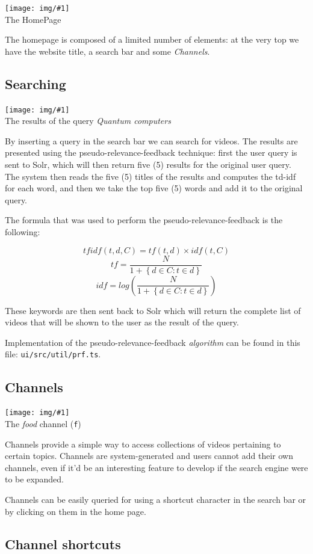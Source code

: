 \documentclass[12pt]{exam}
\newcommand{\lp}{\left(}
\newcommand{\rp}{\right)}
\newcommand{\pic}[2]{{
\begin{center}
\texttt{[image: img/\#1]} \\
{#2}
\end{center}
}}
\begin{document}
\pic{se_home}{The HomePage}

The homepage is composed of a limited number of elements: at the very
top we have the website title, a search bar and some \textit{Channels}.

\subsection{Searching}

\pic{se_query}{The results of the query \textit{Quantum computers}}

By inserting a query in the search bar we can search for videos.
The results are presented using the pseudo-relevance-feedback technique:
first the user query is sent to Solr, which will then return five (5) 
results for the original user query. The system then reads the five (5)
titles of the results and computes the td-idf for each word, and then we take
the top five (5) words and add it to the original query.

The formula that was used to perform the pseudo-relevance-feedback is the
following:

$$
tfidf \lp t, d, C \rp = tf \lp t, d \rp \times idf \lp t, C \rp
$$
$$
tf = \dfrac{N}{1 + \left\{ d \in C : t \in d \right\}}
$$
$$
idf = log \lp \dfrac{N}{1 + \left\{ d \in C : t \in d \right\}} \rp
$$

These keywords are then sent back to Solr which will return the complete list
of videos that will be shown to the user as the result of the query.

Implementation of the pseudo-relevance-feedback \textit{algorithm} can be
found in this file: \texttt{ui/src/util/prf.ts}.

\subsection{Channels}

\pic{se_channel}{The \textit{food} channel (\texttt{f})}

Channels provide a simple way to access collections of videos pertaining
to certain topics. Channels are system-generated and users cannot add
their own channels, even if it'd be an interesting feature to develop if
the search engine were to be expanded.

Channels can be easily queried for using a shortcut character in the search
bar or by clicking on them in the home page.

\subsection*{Channel shortcuts}
\end{document}
